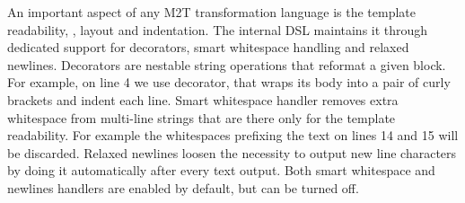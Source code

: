 An important aspect of any M2T transformation language is the template readability, \Eg, layout and indentation.
The internal DSL maintains it through dedicated support for decorators, smart whitespace handling and relaxed newlines.
Decorators are nestable string operations that reformat a given block.
For example, on line 4 we use  decorator, that wraps its body into a pair of curly brackets and indent each line.
Smart whitespace handler removes extra whitespace from multi-line strings that are there only for the template readability.
For example the whitespaces prefixing the text on lines 14 and 15 will be discarded.
Relaxed newlines loosen the necessity to output new line characters by doing it automatically after every text output.
Both smart whitespace and newlines handlers are enabled by default, but can be turned off.


